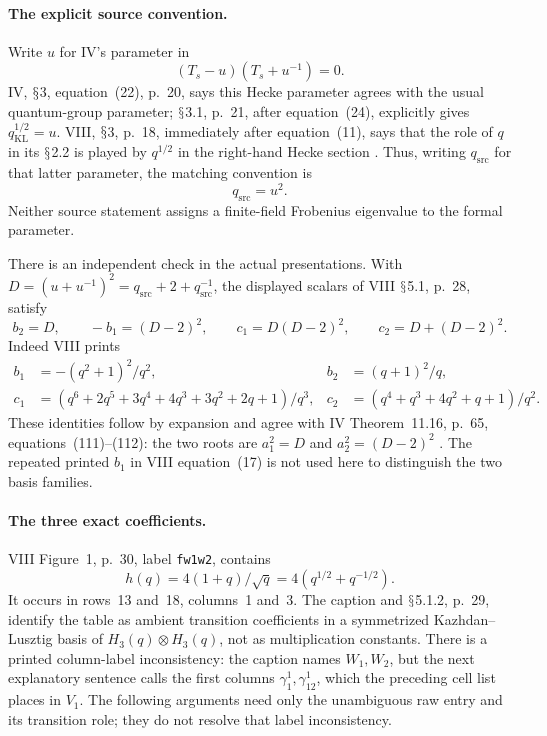 \documentclass[11pt,a4paper]{article}
\renewcommand{\S}{\ensuremath{\mathsection}}
\theoremstyle{named}\newtheorem{finding}{Finding}[section]
\theoremstyle{definition}\newtheorem{definition}[finding]{Definition}
\theoremstyle{remark}\newtheorem{remark}[finding]{Remark}
\begin{document}
\paragraph{The explicit source convention.}
Write \(u\) for IV's parameter in
\[
                     (T_s-u)(T_s+u^{-1})=0.
\]
IV, \S3, equation~(22), p.~20, says this Hecke parameter agrees
with the usual quantum-group parameter; \S3.1, p.~21, after
equation~(24), explicitly gives \(q_{\mathrm{KL}}^{1/2}=u\).
VIII, \S3, p.~18, immediately after equation~(11), says that
the role of \(q\) in its \S2.2 is played by \(q^{1/2}\)
in the right-hand Hecke section \cite{IV,VIII}.
Thus, writing \(q_{\mathrm{src}}\) for that latter parameter,
the matching convention is
\begin{equation}\label{eq:jointSourceParameter}
                          q_{\mathrm{src}}=u^2.
\end{equation}
Neither source statement assigns a finite-field Frobenius
eigenvalue to the formal parameter.

There is an independent check in the actual presentations.
With \(D=(u+u^{-1})^2=q_{\mathrm{src}}+2+q_{\mathrm{src}}^{-1}\),
the displayed scalars of VIII \S5.1, p.~28, satisfy
\[
 b_2=D,\qquad -b_1=(D-2)^2,\qquad
 c_1=D(D-2)^2,\qquad c_2=D+(D-2)^2.
\]
Indeed VIII prints
\[
\begin{aligned}
 b_1&=-(q^2+1)^2/q^2,& b_2&=(q+1)^2/q,\\
 c_1&=(q^6+2q^5+3q^4+4q^3+3q^2+2q+1)/q^3,&
 c_2&=(q^4+q^3+4q^2+q+1)/q^2.
\end{aligned}
\]
These identities follow by expansion and agree with IV
Theorem~11.16, p.~65, equations~(111)--(112):
the two roots are \(a_1^2=D\) and \(a_2^2=(D-2)^2\)
\cite{IV,VIII}.
The repeated printed \(b_1\) in VIII equation~(17) is not
used here to distinguish the two basis families.

\paragraph{The three exact coefficients.}
VIII Figure~1, p.~30, label \texttt{fw1w2}, contains
\begin{equation}\label{eq:jointTransitionCoefficient}
 h(q)=4(1+q)/\sqrt q=4(q^{1/2}+q^{-1/2}).
\end{equation}
It occurs in rows~13 and~18, columns~1 and~3.
The caption and \S5.1.2, p.~29, identify the table as
ambient transition coefficients in a symmetrized
Kazhdan--Lusztig basis of \(H_3(q)\otimes H_3(q)\),
not as multiplication constants.
There is a printed column-label inconsistency:
the caption names \(W_1,W_2\), but the next explanatory
sentence calls the first columns \(\gamma_1^1,\gamma_{12}^1\),
which the preceding cell list places in \(V_1\).
The following arguments need only the unambiguous raw
entry and its transition role; they do not resolve that
label inconsistency.
\end{document}
